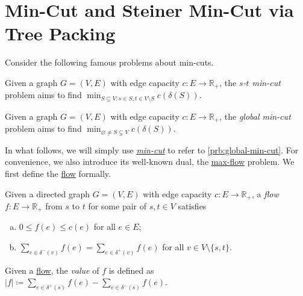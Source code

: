 \section{Min-Cut and Steiner Min-Cut via Tree Packing}
Consider the following famous problems about min-cuts.

\begin{problem}\label{prb:s-t-min-cut}
Given a graph \(G = (V, E)\) with edge capacity \(c \colon E \to \mathbb{R} _{+} \), the \emph{\(s\)-\(t\) min-cut} problem aims to find \(\min _{S \subseteq V \colon s \in S, t \in V\setminus S} c(\delta (S))\).
\end{problem}

\begin{problem}\label{prb:global-min-cut}
Given a graph \(G = (V, E)\) with edge capacity \(c \colon E \to \mathbb{R} _{+} \), the \emph{global min-cut} problem aims to find \(\min _{\varnothing \neq S \subsetneq V} c(\delta (S))\).
\end{problem}

In what follows, we will simply use \hyperref[prb:global-min-cut]{\emph{min-cut}} to refer to \autoref{prb:global-min-cut}. For convenience, we also introduce its well-known dual, the \hyperref[prb:s-t-max-flow]{max-flow} problem. We first define the \hyperref[def:flow]{flow} formally.

\begin{definition}[Flow]\label{def:flow}
	Given a directed graph \(G = (V, E)\) with edge capacity \(c \colon E \to \mathbb{R} _{+}\), a \emph{flow} \(f\colon E \to \mathbb{R} _{+}\) from \(s\) to \(t\) for some pair of \(s, t \in V\) satisfies
	\begin{enumerate}[(a)]
		\item\label{def:flow-capacity} \(0 \leq f(e) \leq c(e)\) for all \(e \in E\);
		\item\label{def:flow-conservation} \(\sum_{e \in \delta ^- (v)} f(e) = \sum_{e \in \delta ^+ (v)} f(e)\) for all \(v \in V\setminus \{ s, t \} \).
	\end{enumerate}
\end{definition}

\begin{notation}[Value]
	Given a \hyperref[def:flow]{flow}, the \emph{value} of \(f\) is defined as \(\lvert f \rvert \coloneqq \sum_{e \in \delta ^+(s)} f(e) - \sum_{e \in \delta ^-(s)} f(e)\).
\end{notation}

